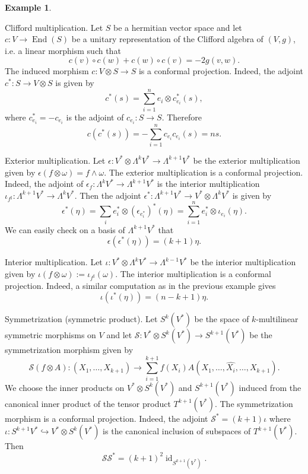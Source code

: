 \documentclass[12pt]{amsart} %
\theoremstyle{definition}
\newtheorem{example}[theorem]{Example}
\numberwithin{equation}{section}
\DeclareMathOperator{\End}{End}
\DeclareMathOperator{\id}{id}
\newcommand{\ra}{\rightarrow}
\begin{document}
\begin{example}\label{firstex}

\item[(1)] Clifford multiplication. Let $S$ be a hermitian vector space and let $c:V\ra \End(S)$ be a unitary representation of the Clifford algebra of $(V,g)$, i.e. a linear morphism such that
\[ c(v)\circ c(w)+c(w)\circ c(v)=- 2 g(v,w).\]
The induced morphism $c:V\otimes S\ra S$ is a conformal projection. Indeed, the adjoint $c^*:S\ra V\otimes S$ is given by
\[ c^*(s)=\sum_{i=1}^ne_i\otimes c_{e_i}^ *(s),\]
where $c_{e_i}^ *=-c_{e_i}$ is the adjoint of $c_{e_i}:S\ra S$. Therefore
\[c(c^*(s))=-\sum_{i=1}^ nc_{e_i}c_{e_i}(s)=ns.\]

\item[(2)] Exterior multiplication. Let $\epsilon:V^ *\otimes \Lambda^{k}V^ *\ra \Lambda^ {k+1}V^ *$ be the exterior multiplication given by $\epsilon(f\otimes \omega)=f\wedge \omega$. The exterior multiplication is a conformal projection. Indeed, the adjoint of $\epsilon_f:\Lambda^kV^*\ra \Lambda^ {k+1}V^*$ is the interior multiplication $\iota_{f^{\sharp}}:\Lambda^ {k+1}V^ *\ra \Lambda^ kV^ *$. Then the adjoint $\epsilon^ *:\Lambda^ {k+1}V^ *\ra V^ *\otimes \Lambda^kV^ * $ is given by
\[\epsilon^ *(\eta)=\sum_{i} e_i^ *\otimes (\epsilon_{e_i^ * })^*(\eta)=\sum_{i=1}^ ne_i^ *\otimes \iota_{e_i}(\eta).\]
We can easily check on a basis of $\Lambda^{k+1}V^ *$ that
\[ \epsilon(\epsilon^ *(\eta))=(k+1)\eta.\]

\item[(3)] Interior multiplication. Let $\iota:V^ *\otimes \Lambda^{k}V^ *\ra \Lambda^ {k-1}V^ *$ be the interior multiplication given by $\iota(f\otimes \omega):=\iota_{f^ {\sharp}}(\omega)$. The interior multiplication is a conformal projection. Indeed, a similar computation as in the previous example gives
\[ \iota(\iota^ *(\eta))=(n-k+1)\eta.\]

\item[(4)] Symmetrization (symmetric product). Let $S^k(V^ *)$ be the space of $k$-multilinear symmetric morphisms on $V$ and let $\mathcal{S}:V^ *\otimes S^k(V^ *)\ra S^ {k+1}(V^ *)$ be the symmetrization morphism given by
\[\mathcal{S}(f\otimes A): (X_1,\ldots,X_{k+1})\ra \sum_{i=1}^ {k+1} f(X_i)A(X_1,\ldots,\hat{X_i},\ldots, X_{k+1}). \]
We choose the inner products on $V^ *\otimes S^k(V^ *)$ and $ S^ {k+1}(V^ *)$ induced from the canonical inner product of the tensor product $T^ {k+1}(V^ *)$. The symmetrization morphism is a conformal projection. Indeed, the adjoint $\mathcal{S}^* = (k+1)\iota$ where $\iota:S^ {k+1}V^ *\hookrightarrow V^ *\otimes S^k(V^ *)$ is the canonical inclusion of subspaces of $T^ {k+1}(V^ *)$. Then
\[\mathcal{S}\mathcal{S}^ *=(k+1)^ 2\id_{S^ {k+1}(V^ *)}. \]


\end{example}
\end{document}
